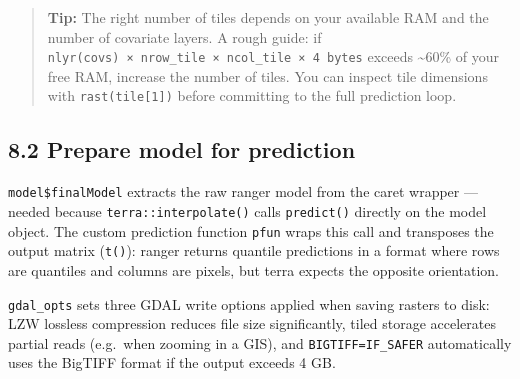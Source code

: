 \documentclass[
  10pt,
  b5paper,
  oneside]{book}
\newenvironment{Shaded}{\begin{snugshade}}{\end{snugshade}}
\newcommand{\ControlFlowTok}[1]{\textcolor[rgb]{0.13,0.29,0.53}{\textbf{#1}}}
\newcommand{\FunctionTok}[1]{\textcolor[rgb]{0.13,0.29,0.53}{\textbf{#1}}}
\newcommand{\NormalTok}[1]{#1}
\newcommand{\OtherTok}[1]{\textcolor[rgb]{0.56,0.35,0.01}{#1}}
\newcommand{\SpecialCharTok}[1]{\textcolor[rgb]{0.81,0.36,0.00}{\textbf{#1}}}
\newcommand{\StringTok}[1]{\textcolor[rgb]{0.31,0.60,0.02}{#1}}
\begin{document}
\begin{quote}
\textbf{Tip:} The right number of tiles depends on your available RAM and the number of covariate layers. A rough guide: if \texttt{nlyr(covs)\ ×\ nrow\_tile\ ×\ ncol\_tile\ ×\ 4\ bytes} exceeds \textasciitilde60\% of your free RAM, increase the number of tiles. You can inspect tile dimensions with \texttt{rast(tile{[}1{]})} before committing to the full prediction loop.
\end{quote}

\subsection*{8.2 Prepare model for prediction}\label{prepare-model-for-prediction}

\begin{Shaded}
\end{Shaded}

\texttt{model\$finalModel} extracts the raw ranger model from the caret wrapper --- needed because \texttt{terra::interpolate()} calls \texttt{predict()} directly on the model object. The custom prediction function \texttt{pfun} wraps this call and transposes the output matrix (\texttt{t()}): ranger returns quantile predictions in a format where rows are quantiles and columns are pixels, but terra expects the opposite orientation.

\texttt{gdal\_opts} sets three GDAL write options applied when saving rasters to disk: LZW lossless compression reduces file size significantly, tiled storage accelerates partial reads (e.g.~when zooming in a GIS), and \texttt{BIGTIFF=IF\_SAFER} automatically uses the BigTIFF format if the output exceeds 4 GB.
\end{document}
